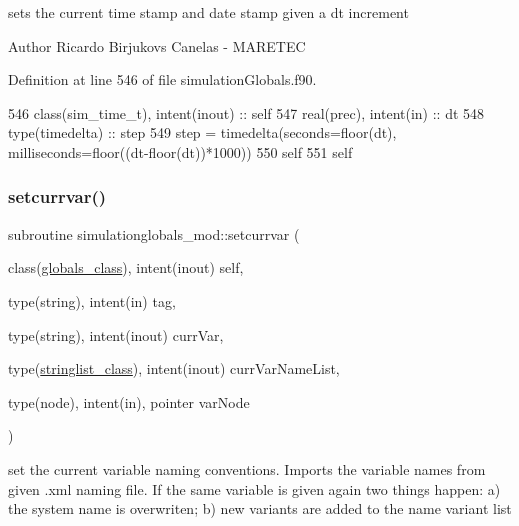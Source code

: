 sets the current time stamp and date stamp given a dt increment 

\begin{DoxyAuthor}{Author}
Ricardo Birjukovs Canelas -\/ M\+A\+R\+E\+T\+EC 
\end{DoxyAuthor}


Definition at line 546 of file simulation\+Globals.\+f90.


\begin{DoxyCode}
546     \textcolor{keywordtype}{class}(sim\_time\_t), \textcolor{keywordtype}{intent(inout)} :: self
547     \textcolor{keywordtype}{real(prec)}, \textcolor{keywordtype}{intent(in)} :: dt
548     \textcolor{keywordtype}{type}(timedelta) :: step
549     step = timedelta(seconds=floor(dt), milliseconds=floor((dt-floor(dt))*1000))
550     self%
551     self%
\end{DoxyCode}
\mbox{\label{namespacesimulationglobals__mod_a4dd64cb7a896b62d90e20a7eab65a6bf}} 
\subsubsection{\texorpdfstring{setcurrvar()}{setcurrvar()}}
{\footnotesize\ttfamily subroutine simulationglobals\+\_\+mod\+::setcurrvar (\begin{DoxyParamCaption}\item[{class(\mbox{\hyperlink{structsimulationglobals__mod_1_1globals__class}{globals\+\_\+class}}), intent(inout)}]{self,  }\item[{type(string), intent(in)}]{tag,  }\item[{type(string), intent(inout)}]{curr\+Var,  }\item[{type(\mbox{\hyperlink{structsimulationglobals__mod_1_1stringlist__class}{stringlist\+\_\+class}}), intent(inout)}]{curr\+Var\+Name\+List,  }\item[{type(node), intent(in), pointer}]{var\+Node }\end{DoxyParamCaption})\hspace{0.3cm}{\ttfamily [private]}}



set the current variable naming conventions. Imports the variable names from given .xml naming file. If the same variable is given again two things happen\+: a) the system name is overwriten; b) new variants are added to the name variant list 

